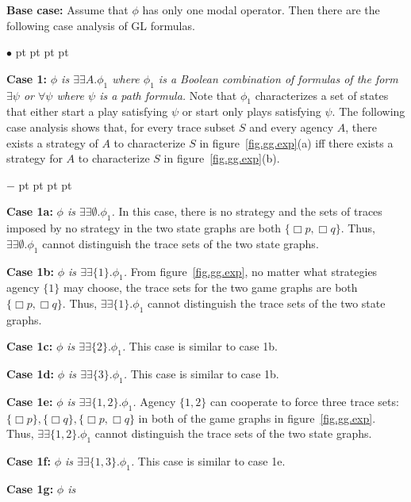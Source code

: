 \documentclass[11pt]{article}
\newcommand{\existsb}{\mbox{$\exists\!\!\exists$}}
\newcommand{\pfrr}{\Box}
\newenvironment{list1}{\begin{list}{$\bullet$}
{\topsep 0 pt \parsep 0 pt \partopsep 0 pt \itemsep 0 pt}}{\end{list}}
\newenvironment{list2}{\begin{list}{$-$}
{\topsep 0 pt \parsep 0 pt \partopsep 0 pt \itemsep 0 pt}}{\end{list}}
\begin{document}
\noindent 
{\bf Base case:} Assume that $\phi$ has only one modal operator.
Then there are the following case analysis of GL formulas.
\begin{list1}
\item {\bf Case 1:} {\em $\phi$ is $\existsb  A.\phi_1$
    where $\phi_1$ is a Boolean combination of
    formulas of the form $\exists \psi$ or $\forall \psi$
    where $\psi$ is a path formula.}
    Note that $\phi_1$ characterizes a set of states that 
    either start a play satisfying $\psi$ or 
    start only plays satisfying $\psi$.
    The following case analysis shows that, for every
    trace subset $S$ and every agency $A$,
    there exists a strategy of $A$ to characterize
    $S$ in figure~\ref{fig.gg.exp}(a) iff
    there exists a strategy for $A$ to characterize
    $S$ in figure~\ref{fig.gg.exp}(b).
    \begin{list2}
    \item {\bf Case 1a:} {\em $\phi$ is $\existsb\emptyset.\phi_1$.}
        In this case, there is no strategy and the sets of traces
        imposed by no strategy in the two state graphs are
        both $\{\pfrr p,\pfrr q\}$.
        Thus, $\existsb\emptyset.\phi_1$ cannot distinguish the trace sets of the
        two state graphs.
    \item {\bf Case 1b:} {\em $\phi$ is $\existsb\{1\}.\phi_1$.}
        From figure~\ref{fig.gg.exp}, no matter what strategies
        agency $\{1\}$ may choose, the
        trace sets for the two game graphs are both
        $\{\pfrr p,\pfrr q\}$.
        Thus, $\existsb\{1\}.\phi_1$ cannot distinguish the trace sets of the
        two state graphs.
    \item {\bf Case 1c:} {\em $\phi$ is
        $\existsb\{2\}.\phi_1$.}
        This case is similar to case 1b.
    \item {\bf Case 1d:} {\em $\phi$ is
        $\existsb\{3\}.\phi_1$.}
        This case is similar to case 1b.
    \item {\bf Case 1e:} {\em $\phi$ is
        $\existsb\{1,2\}.\phi_1$.}
        Agency $\{1, 2\}$ can cooperate to force three trace sets:
        $\{\pfrr p\}, \{\pfrr q\}, \{\pfrr p,\pfrr q\}$
        in both of the game graphs in figure~\ref{fig.gg.exp}.
        Thus, $\existsb\{1,2\}.\phi_1$ cannot distinguish the trace sets of the
        two state graphs.
    \item {\bf Case 1f:} {\em $\phi$ is
        $\existsb\{1,3\}.\phi_1$.}
        This case is similar to case 1e.
    \item {\bf Case 1g:} {\em $\phi$ is
}
\end{list2}
\end{list1}
\end{document}
